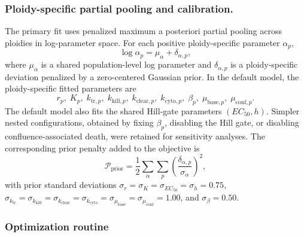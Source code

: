 \documentclass[11pt,notitlepage]{article}
\begin{document}
\subsubsection{Ploidy-specific partial pooling and calibration.}
The primary fit uses penalized maximum a posteriori partial pooling across ploidies in log-parameter space. For each positive ploidy-specific parameter $\alpha_p$,
\[
\log \alpha_p=\mu_{\alpha}+\delta_{\alpha,p},
\]
where $\mu_{\alpha}$ is a shared population-level log parameter and $\delta_{\alpha,p}$ is a ploidy-specific deviation penalized by a zero-centered Gaussian prior. In the default model, the ploidy-specific fitted parameters are
\[
r_p,\; K_p,\; k_{\mathrm{tr},p},\; k_{\mathrm{kill},p},\; k_{\mathrm{clear},p},\; k_{\mathrm{cyto},p},\; \beta_p,\; \mu_{\mathrm{base},p},\; \mu_{\mathrm{conf},p}.
\]
The default model also fits the shared Hill-gate parameters $(EC_{50},h)$. Simpler nested configurations, obtained by fixing $\beta_p$, disabling the Hill gate, or disabling confluence-associated death, were retained for sensitivity analyses.
The corresponding prior penalty added to the objective is
\[
\mathcal{P}_{\mathrm{prior}}
=
\frac{1}{2}\sum_{\alpha}\sum_{p}
\left(\frac{\delta_{\alpha,p}}{\sigma_{\alpha}}\right)^2,
\]
with prior standard deviations
$\sigma_r=\sigma_K=\sigma_{EC_{50}}=\sigma_h=0.75$,
$\sigma_{k_{\mathrm{tr}}}=\sigma_{k_{\mathrm{kill}}}=\sigma_{k_{\mathrm{clear}}}=\sigma_{k_{\mathrm{cyto}}}=\sigma_{\mu_{\mathrm{base}}}=\sigma_{\mu_{\mathrm{conf}}}=1.00$,
and $\sigma_{\beta}=0.50$.


\subsubsection{Optimization routine}
\end{document}
